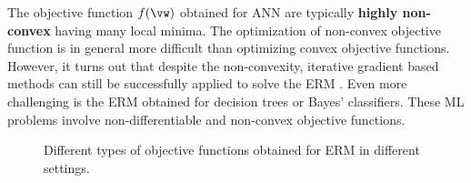 \documentclass[12pt]{report}
\begin{document}
The objective function $f(\vw)$ obtained for ANN are typically 
{\bf highly non-convex} having many local minima. The optimization 
of non-convex objective function is in general more difficult than 
optimizing convex objective functions. However, it turns out that 
despite the non-convexity, iterative gradient based methods can 
still be successfully applied to solve the ERM \cite{Goodfellow-et-al-2016}. 
Even more challenging is the ERM obtained for decision trees or 
Bayes' classifiers. These ML problems involve non-differentiable 
and non-convex objective functions. 


	
\begin{figure}[htbp]
\begin{center}
\end{center}
\caption{Different types of objective functions obtained for ERM in different settings.}
\label{fig_diff_types_bojec}
\end{figure}
\end{document}
